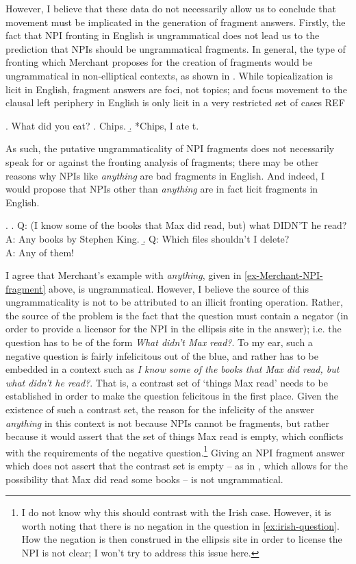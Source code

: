\documentclass[11pt,letterpaper]{article}
\begin{document}
However, I believe that these data do not necessarily allow us to conclude that movement must be implicated in the generation of fragment answers. Firstly, the fact that NPI fronting in English is ungrammatical does not lead us to the prediction that NPIs should be ungrammatical fragments. In general, the type of fronting which Merchant proposes for the creation of fragments would be ungrammatical in non-elliptical contexts, as shown in \Next. While topicalization is licit in English, fragment answers are foci, not topics; and focus movement to the clausal left periphery in English is only licit in a very restricted set of cases REF%

\ex. 	What did you eat?
	\a. Chips.
	\b. *Chips, I ate t.
	
As such, the putative ungrammaticality of NPI fragments does not necessarily speak for or against the fronting analysis of fragments; there may be other reasons why NPIs like {\it anything} are bad fragments in English. And indeed, I would propose that NPIs other than {\it anything} are in fact licit fragments in English.

\ex. 		\a. Q: (I know some of the books that Max did read, but) what DIDN'T he read?\\
	A: Any books by Stephen King.
		\b. Q: Which files shouldn't I delete?\\
		A: Any of them!
		
I agree that Merchant's example with {\it anything}, given in \ref{ex-Merchant-NPI-fragment} above, is ungrammatical. However, I believe the source of this ungrammaticality is not to be attributed to an illicit fronting operation. Rather, the source of the problem is the fact that the question must contain a negator (in order to provide a licensor for the NPI in the ellipsis site in the answer); i.e. the question has to be of the form {\it What didn't Max read?}. To my ear, such a negative question is fairly infelicitous out of the blue, and rather has to be embedded in a context such as {\it I know some of the books that Max \emph{did} read, but what \emph{didn't} he read?}. That is, a contrast set of `things Max read' needs to be established in order to make the question felicitous in the first place. Given the existence of such a contrast set, the reason for the infelicity of the answer {\it anything} in this context is not because NPIs cannot be fragments, but rather because it would assert that the set of things Max read is empty, which conflicts with the requirements of the negative question.\footnote{I do not know why this should contrast with the Irish case. However, it is worth noting that there is no negation in the question in \ref{ex:irish-question}. How the negation is then construed in the ellipsis site in order to license the NPI is not clear; I won't try to address this issue here.} Giving an NPI fragment answer which does not assert that the contrast set is empty -- as in \Last[a], which allows for the possibility that Max did read some books -- is not ungrammatical.
\end{document}
